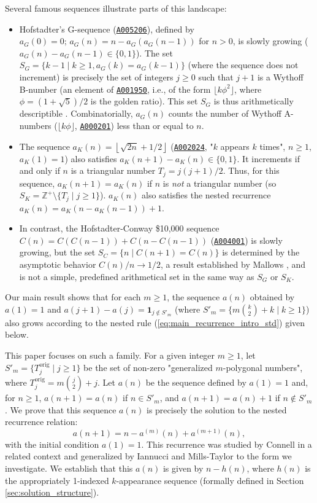 \documentclass[11pt,a4paper]{article} %
\theoremstyle{remark}
\newcommand{\Zplus}{\mathbb{Z}^+} %
\newcommand{\floor}[1]{\left\lfloor #1 \right\rfloor} %
\newcommand{\oeislink}[1]{\href{https://oeis.org/#1}{\texttt{#1}}}
\newcommand{\indicator}[1]{\mathbf{1}_{#1}} %
\begin{document}
Several famous sequences illustrate parts of this landscape:
\begin{itemize}
    \item Hofstadter's G-sequence (\oeislink{A005206}), defined by $a_G(0)=0;\, a_G(n) = n - a_G(a_G(n-1))$ for $n > 0$, is slowly growing ($a_G(n)-a_G(n-1) \in \{0,1\}$). The set $S_G = \{k-1 \mid k \ge 1, a_G(k)=a_G(k-1)\}$ (where the sequence does not increment) is precisely the set of integers $j \ge 0$ such that $j+1$ is a Wythoff B-number (an element of \oeislink{A001950}, i.e., of the form $\lfloor k\phi^2 \rfloor$, where $\phi=(1+\sqrt{5})/2$ is the golden ratio). This set $S_G$ is thus arithmetically descriptible \cite{Hofstadter1979, Kimberling2016}. Combinatorially, $a_G(n)$ counts the number of Wythoff A-numbers ($\lfloor k\phi \rfloor$, \oeislink{A000201}) less than or equal to $n$.
    \item The sequence $a_K(n) = \floor{\sqrt{2n}+1/2}$ (\oeislink{A002024}, "$k$ appears $k$ times", $n \ge 1$, $a_K(1)=1$) also satisfies $a_K(n+1)-a_K(n) \in \{0,1\}$. It increments if and only if $n$ is a triangular number $T_j=j(j+1)/2$. Thus, for this sequence, $a_K(n+1)=a_K(n)$ if $n$ is \emph{not} a triangular number (so $S_K = \Zplus \setminus \{T_j \mid j \ge 1\}$). $a_K(n)$ also satisfies the nested recurrence $a_K(n)=a_K(n-a_K(n-1))+1$.
    \item In contrast, the Hofstadter-Conway \$10,000 sequence $C(n)=C(C(n-1))+C(n-C(n-1))$ (\oeislink{A004001}) is slowly growing, but the set $S_C = \{n \mid C(n+1)=C(n)\}$ is determined by the asymptotic behavior $C(n)/n \to 1/2$, a result established by Mallows \cite{Mallows1991}, and is not a simple, predefined arithmetical set in the same way as $S_G$ or $S_K$.
\end{itemize}
Our main result shows that for each $m \ge 1$, the sequence $a(n)$ obtained by $a(1)=1$ and $a(j+1)-a(j) = \indicator{j \notin S'_m}$ (where $S'_m = \{m\binom{k}{2}+k \mid k \ge 1\}$) also grows according to the nested rule (\ref{eq:main_recurrence_intro_std}) given below.

This paper focuses on such a family. For a given integer $m \ge 1$, let $S'_m = \{T_j^{\text{orig}} \mid j \ge 1\}$ be the set of non-zero "generalized $m$-polygonal numbers", where $T_j^{\text{orig}} = m\binom{j}{2}+j$. Let $a(n)$ be the sequence defined by $a(1)=1$ and, for $n \ge 1$, $a(n+1)=a(n)$ if $n \in S'_m$, and $a(n+1)=a(n)+1$ if $n \notin S'_m$. We prove that this sequence $a(n)$ is precisely the solution to the nested recurrence relation:
\begin{equation} \label{eq:main_recurrence_intro_std}
a(n+1) = n - a^{(m)}(n) + a^{(m+1)}(n),
\end{equation}
with the initial condition $a(1)=1$. This recurrence was studied by Connell \cite{Connell1959} in a related context and generalized by Iannucci and Mills-Taylor \cite{Iannucci1999} to the form we investigate. We establish that this $a(n)$ is given by $n-h(n)$, where $h(n)$ is the appropriately 1-indexed $k$-appearance sequence (formally defined in Section \ref{sec:solution_structure}).
\end{document}

